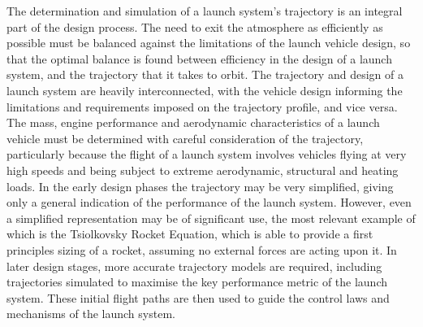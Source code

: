 	The determination and simulation of a launch system's trajectory is an integral part of the design process. The need to exit the atmosphere as efficiently as possible must be balanced against the limitations of the launch vehicle design, so that the optimal balance is found between efficiency in the design of a launch system, and the trajectory that it takes to orbit. 
	 The trajectory and design of a launch system are heavily interconnected, with the vehicle design informing the limitations and requirements imposed on the trajectory profile, and vice versa. 
	 The mass, engine performance and aerodynamic characteristics of a launch vehicle must be determined with careful consideration of the trajectory, particularly because the flight of a launch system involves vehicles flying at very high speeds and being subject to extreme aerodynamic, structural and heating loads. In the early design phases the trajectory may be very simplified, giving only a general indication of the performance of the launch system. However, even a simplified representation may be of significant use, the most relevant example of which is the Tsiolkovsky Rocket Equation, which is able to provide a first principles sizing of a rocket, assuming no external forces are acting upon it. In later design stages, more accurate trajectory models are required, including trajectories simulated to maximise the key performance metric of the launch system. These initial flight paths are then used to guide the control laws and mechanisms of the launch system.

